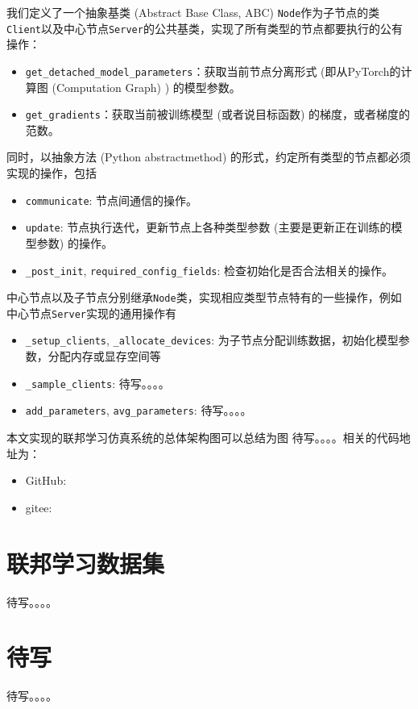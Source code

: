 我们定义了一个抽象基类 (Abstract Base Class, ABC) \texttt{Node}作为子节点的类\texttt{Client}以及中心节点\texttt{Server}的公共基类，实现了所有类型的节点都要执行的公有操作：
\begin{itemize}
    \item \texttt{get\_detached\_model\_parameters}：获取当前节点分离形式 (即从PyTorch的计算图 (Computation Graph) ) 的模型参数。
    \item \texttt{get\_gradients}：获取当前被训练模型 (或者说目标函数) 的梯度，或者梯度的范数。
\end{itemize}
同时，以抽象方法 (Python abstractmethod) 的形式，约定所有类型的节点都必须实现的操作，包括
\begin{itemize}
    \item \texttt{communicate}: 节点间通信的操作。
    \item \texttt{update}: 节点执行迭代，更新节点上各种类型参数 (主要是更新正在训练的模型参数) 的操作。
    \item \texttt{\_post\_init}, \texttt{required\_config\_fields}: 检查初始化是否合法相关的操作。
\end{itemize}

中心节点以及子节点分别继承\texttt{Node}类，实现相应类型节点特有的一些操作，例如中心节点\texttt{Server}实现的通用操作有
\begin{itemize}
    \item \texttt{\_setup\_clients}, \texttt{\_allocate\_devices}: 为子节点分配训练数据，初始化模型参数，分配内存或显存空间等
    \item \texttt{\_sample\_clients}: 待写。。。。
    \item \texttt{add\_parameters}, \texttt{avg\_parameters}: 待写。。。。
\end{itemize}

本文实现的联邦学习仿真系统的总体架构图可以总结为图 待写。。。。相关的代码地址为：
\begin{itemize}
    \item GitHub: \urlgithub
    \item gitee: \urlgitee
\end{itemize}

\section{联邦学习数据集}
\label{sec:chap5-datasets}


待写。。。。

\section{待写}


待写。。。。
